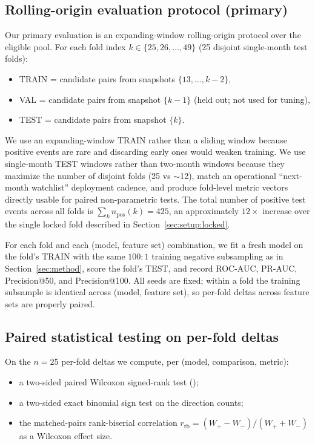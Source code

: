 \subsection{Rolling-origin evaluation protocol (primary)}
\label{sec:setup:rolling}

Our primary evaluation is an expanding-window rolling-origin protocol
over the eligible pool. For each fold index
$k \in \{25, 26, \dots, 49\}$ (25 disjoint single-month test folds):
\begin{itemize}
\item TRAIN  = candidate pairs from snapshots $\{13, \dots, k{-}2\}$,
\item VAL    = candidate pairs from snapshot $\{k{-}1\}$ (held out; not used for tuning),
\item TEST   = candidate pairs from snapshot $\{k\}$.
\end{itemize}
We use an expanding-window TRAIN rather than a sliding window because
positive events are rare and discarding early ones would weaken
training. We use single-month TEST windows rather than two-month
windows because they maximize the number of disjoint folds (25 vs
$\sim$12), match an operational ``next-month watchlist'' deployment
cadence, and produce fold-level metric vectors directly usable for
paired non-parametric tests. The total number of positive test events
across all folds is $\sum_{k} n_{\mathrm{pos}}(k) = 425$, an
approximately $12\!\times$ increase over the single locked fold
described in Section~\ref{sec:setup:locked}.

For each fold and each (model, feature set) combination, we fit a
fresh model on the fold's TRAIN with the same $100{:}1$ training
negative subsampling as in Section~\ref{sec:method}, score the fold's
TEST, and record ROC-AUC, PR-AUC, Precision@50, and Precision@100.
All seeds are fixed; within a fold the training subsample is
identical across (model, feature set), so per-fold deltas across
feature sets are properly paired.

\subsection{Paired statistical testing on per-fold deltas}
\label{sec:setup:stats}

On the $n = 25$ per-fold deltas we compute, per (model, comparison,
metric):
\begin{itemize}
\item a two-sided paired Wilcoxon signed-rank test
();
\item a two-sided exact binomial sign test on the direction counts;
\item the matched-pairs rank-biserial correlation
$r_{\mathrm{rb}} = (W_+ - W_-)/(W_+ + W_-)$ as a Wilcoxon effect
size.
\end{itemize}

